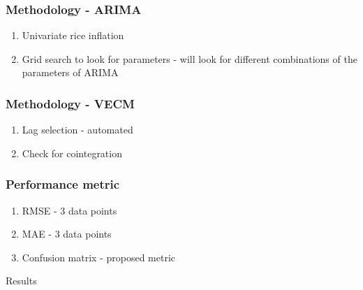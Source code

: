 \documentclass{beamer}
\begin{document}
\begin{frame}
	\frametitle{Methodology - ARIMA}
	\begin{enumerate}
		\item Univariate rice inflation
		\item Grid search to look for parameters - will look for different combinations of the parameters of ARIMA
	\end{enumerate}
\end{frame}
\begin{frame}
	\frametitle{Methodology - VECM}
	\begin{enumerate}
		\item Lag selection - automated
		\item Check for cointegration
	\end{enumerate}
\end{frame}

\begin{frame}
	\frametitle{Performance metric}
	\begin{enumerate}
		\item RMSE - 3 data points
		\item MAE - 3 data points
		\item Confusion matrix - proposed metric
	\end{enumerate}
\end{frame}
\begin{frame}%
	\begin{center}
		{\fontsize{40}{50}\selectfont Results}
	\end{center}
\end{frame}
\end{document}
